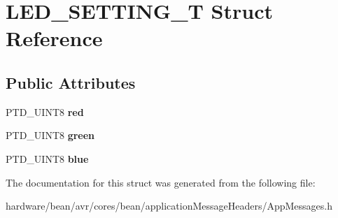 \hypertarget{struct_l_e_d___s_e_t_t_i_n_g___t}{}\section{L\+E\+D\+\_\+\+S\+E\+T\+T\+I\+N\+G\+\_\+T Struct Reference}
\label{struct_l_e_d___s_e_t_t_i_n_g___t}
\subsection*{Public Attributes}
\begin{DoxyCompactItemize}
\item 
P\+T\+D\+\_\+\+U\+I\+N\+T8 {\bfseries red}\hypertarget{struct_l_e_d___s_e_t_t_i_n_g___t_a4af1cfe5d52b72803f31f1aefeba4dad}{}\label{struct_l_e_d___s_e_t_t_i_n_g___t_a4af1cfe5d52b72803f31f1aefeba4dad}

\item 
P\+T\+D\+\_\+\+U\+I\+N\+T8 {\bfseries green}\hypertarget{struct_l_e_d___s_e_t_t_i_n_g___t_ab6d80e7108e2a40f38db65ed7d068284}{}\label{struct_l_e_d___s_e_t_t_i_n_g___t_ab6d80e7108e2a40f38db65ed7d068284}

\item 
P\+T\+D\+\_\+\+U\+I\+N\+T8 {\bfseries blue}\hypertarget{struct_l_e_d___s_e_t_t_i_n_g___t_a453318108cb8ffe685e852435db2e48d}{}\label{struct_l_e_d___s_e_t_t_i_n_g___t_a453318108cb8ffe685e852435db2e48d}

\end{DoxyCompactItemize}


The documentation for this struct was generated from the following file\+:\begin{DoxyCompactItemize}
\item 
hardware/bean/avr/cores/bean/application\+Message\+Headers/App\+Messages.\+h\end{DoxyCompactItemize}
